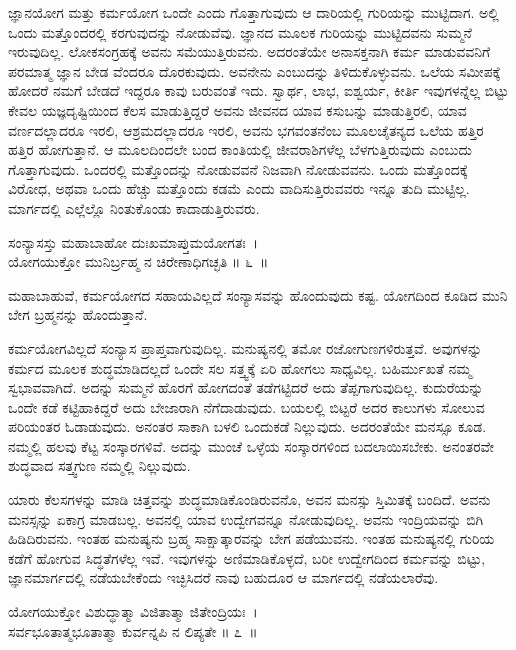 ಜ್ಞಾನಯೋಗ ಮತ್ತು ಕರ್ಮಯೋಗ ಒಂದೇ ಎಂದು ಗೊತ್ತಾಗುವುದು ಆ ದಾರಿಯಲ್ಲಿ ಗುರಿಯನ್ನು ಮುಟ್ಟಿದಾಗ. ಅಲ್ಲಿ ಒಂದು ಮತ್ತೊಂದರಲ್ಲಿ ಕರಗುವುದನ್ನು ನೋಡುವೆವು. ಜ್ಞಾನದ ಮೂಲಕ ಗುರಿಯನ್ನು ಮುಟ್ಟಿದವನು ಸುಮ್ಮನೆ ಇರುವುದಿಲ್ಲ. ಲೋಕಸಂಗ್ರಹಕ್ಕೆ ಅವನು ಸಮೆಯುತ್ತಿರುವನು. ಅದರಂತೆಯೇ ಅನಾಸಕ್ತನಾಗಿ ಕರ್ಮ ಮಾಡುವವನಿಗೆ ಪರಮಾತ್ಮ ಜ್ಞಾನ ಬೇಡ ವೆಂದರೂ ದೊರಕುವುದು. ಅವನೇನು ಎಂಬುದನ್ನು ತಿಳಿದುಕೊಳ್ಳುವನು. ಒಲೆಯ ಸಮೀಪಕ್ಕೆ ಹೋದರೆ ನಮಗೆ ಬೇಡದೆ ಇದ್ದರೂ ಕಾವು ಬರುವಂತೆ ಇದು. ಸ್ವಾರ್ಥ, ಲಾಭ, ಐಶ್ವರ್ಯ, ಕೀರ್ತಿ ಇವುಗಳನ್ನೆಲ್ಲ ಬಿಟ್ಟು ಕೇವಲ ಯಜ್ಞದೃಷ್ಟಿಯಿಂದ ಕೆಲಸ ಮಾಡುತ್ತಿದ್ದರೆ ಅವನು ಜೀವನದ ಯಾವ ಕಸುಬನ್ನು ಮಾಡುತ್ತಿರಲಿ, ಯಾವ ವರ್ಣದಲ್ಲಾದರೂ ಇರಲಿ, ಆಶ್ರಮದಲ್ಲಾದರೂ ಇರಲಿ, ಅವನು ಭಗವಂತನೆಂಬ ಮೂಲಚೈತನ್ಯದ ಒಲೆಯ ಹತ್ತಿರ ಹತ್ತಿರ ಹೋಗುತ್ತಾನೆ. ಆ ಮೂಲದಿಂದಲೇ ಬಂದ ಕಾಂತಿಯಲ್ಲಿ ಜೀವರಾಶಿಗಳೆಲ್ಲ ಬೆಳಗುತ್ತಿರುವುದು ಎಂಬುದು ಗೊತ್ತಾಗುವುದು. ಒಂದರಲ್ಲಿ ಮತ್ತೊಂದನ್ನು ನೋಡುವವನೆ ನಿಜವಾಗಿ ನೋಡುವವನು. ಒಂದು ಮತ್ತೊಂದಕ್ಕೆ ವಿರೋಧ, ಅಥವಾ ಒಂದು ಹೆಚ್ಚು ಮತ್ತೊಂದು ಕಡಮೆ ಎಂದು ವಾದಿಸು\-ತ್ತಿರುವವರು ಇನ್ನೂ ತುದಿ ಮುಟ್ಟಿಲ್ಲ. ಮಾರ್ಗದಲ್ಲಿ ಎಲ್ಲೆಲ್ಲೊ ನಿಂತುಕೊಂಡು ಕಾದಾಡುತ್ತಿರುವರು.

\begin{shloka}
ಸಂನ್ಯಾಸಸ್ತು ಮಹಾಬಾಹೋ ದುಃಖಮಾಪ್ತುಮಯೋಗತಃ~।\\ಯೋಗಯುಕ್ತೋ ಮುನಿರ್ಬ್ರಹ್ಮ ನ ಚಿರೇಣಾಧಿಗಚ್ಛತಿ \hfill॥ ೬~॥
\end{shloka}

\begin{artha}
ಮಹಾಬಾಹುವೆ, ಕರ್ಮಯೋಗದ ಸಹಾಯವಿಲ್ಲದೆ ಸಂನ್ಯಾಸವನ್ನು ಹೊಂದುವುದು ಕಷ್ಟ. ಯೋಗದಿಂದ ಕೂಡಿದ ಮುನಿ ಬೇಗ ಬ್ರಹ್ಮನನ್ನು ಹೊಂದುತ್ತಾನೆ.
\end{artha}

ಕರ್ಮಯೋಗವಿಲ್ಲದೆ ಸಂನ್ಯಾಸ ಪ್ರಾಪ್ತವಾಗುವುದಿಲ್ಲ. ಮನುಷ್ಯನಲ್ಲಿ ತಮೋ ರಜೋಗುಣ\-ಗಳಿರುತ್ತವೆ. ಅವುಗಳನ್ನು ಕರ್ಮದ ಮೂಲಕ ಶುದ್ಧಮಾಡಿದಲ್ಲದೆ ಒಂದೇ ಸಲ ಸತ್ತ್ವಕ್ಕೆ ಏರಿ ಹೋಗಲು ಸಾಧ್ಯವಿಲ್ಲ. ಬಹಿರ್ಮುಖತೆ ನಮ್ಮ ಸ್ವಭಾವವಾಗಿದೆ. ಅದನ್ನು ಸುಮ್ಮನೆ ಹೊರಗೆ ಹೋಗದಂತೆ ತಡೆಗಟ್ಟಿದರೆ ಅದು ತೆಪ್ಪಗಾಗುವುದಿಲ್ಲ. ಕುದುರೆಯನ್ನು ಒಂದೇ ಕಡೆ ಕಟ್ಟಿಹಾಕಿದ್ದರೆ ಅದು ಬೇಜಾರಾಗಿ ನೆಗೆದಾಡುವುದು. ಬಯಲಲ್ಲಿ ಬಿಟ್ಟರೆ ಅದರ ಕಾಲುಗಳು ಸೋಲುವ ಪರಿಯಂತರ ಓಡಾಡುವುದು. ಅನಂತರ ಸಾಕಾಗಿ ಬಳಲಿ ಒಂದುಕಡೆ ನಿಲ್ಲುವುದು. ಅದರಂತೆಯೇ ಮನಸ್ಸೂ ಕೂಡ. ನಮ್ಮಲ್ಲಿ ಹಲವು ಕೆಟ್ಟ ಸಂಸ್ಕಾರಗಳಿವೆ. ಅದನ್ನು ಮುಂಚೆ ಒಳ್ಳೆಯ ಸಂಸ್ಕಾರಗಳಿಂದ ಬದಲಾಯಿಸಬೇಕು. ಅನಂತರವೇ ಶುದ್ಧವಾದ ಸತ್ತ್ವಗುಣ ನಮ್ಮಲ್ಲಿ ನಿಲ್ಲುವುದು.

\newpage

ಯಾರು ಕೆಲಸಗಳನ್ನು ಮಾಡಿ ಚಿತ್ತವನ್ನು ಶುದ್ಧಮಾಡಿಕೊಂಡಿರುವನೊ, ಅವನ ಮನಸ್ಸು ಸ್ತಿಮಿತಕ್ಕೆ ಬಂದಿದೆ. ಅವನು ಮನಸ್ಸನ್ನು ಏಕಾಗ್ರ ಮಾಡಬಲ್ಲ. ಅವನಲ್ಲಿ ಯಾವ ಉದ್ವೇಗವನ್ನೂ ನೋಡುವುದಿಲ್ಲ. ಅವನು ಇಂದ್ರಿಯವನ್ನು ಬಿಗಿ ಹಿಡಿದಿರುವನು. ಇಂತಹ ಮನುಷ್ಯನು ಬ್ರಹ್ಮ ಸಾಕ್ಷಾತ್ಕಾರವನ್ನು ಬೇಗ ಪಡೆಯುವನು. ಇಂತಹ ಮನುಷ್ಯನಲ್ಲಿ ಗುರಿಯ ಕಡೆಗೆ ಹೋಗುವ ಸಿದ್ಧತೆಗಳೆಲ್ಲ ಇವೆ. ಇವುಗಳನ್ನು ಅಣಿಮಾಡಿಕೊಳ್ಳದೆ, ಬರೀ ಉದ್ವೇಗದಿಂದ ಕರ್ಮವನ್ನು ಬಿಟ್ಟು, ಜ್ಞಾನಮಾರ್ಗದಲ್ಲಿ ನಡೆಯಬೇಕೆಂದು ಇಚ್ಛಿಸಿದರೆ ನಾವು ಬಹುದೂರ ಆ ಮಾರ್ಗದಲ್ಲಿ ನಡೆಯಲಾರೆವು.

\begin{shloka}
ಯೋಗಯುಕ್ತೋ ವಿಶುದ್ಧಾತ್ಮಾ ವಿಜಿತಾತ್ಮಾ ಜಿತೇಂದ್ರಿಯಃ~।\\ಸರ್ವಭೂತಾತ್ಮಭೂತಾತ್ಮಾ ಕುರ್ವನ್ನಪಿ ನ ಲಿಪ್ಯತೇ \hfill॥ ೭~॥
\end{shloka}

